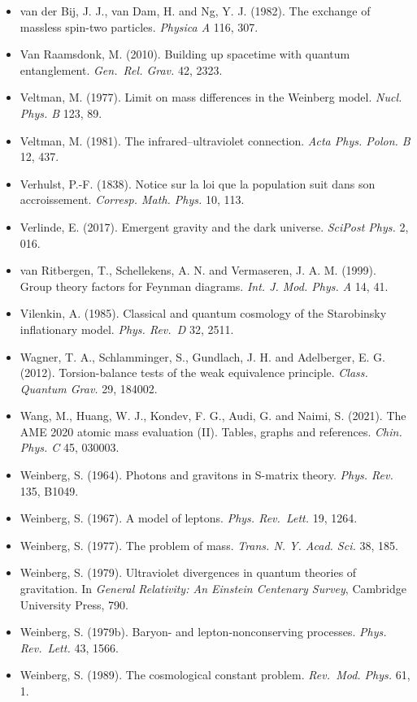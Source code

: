 \documentclass[
  11pt,
]{article}
\begin{document}
\begin{itemize}
\item
  van der Bij, J. J., van Dam, H. and Ng, Y. J. (1982). The exchange of massless spin-two particles. \emph{Physica A} 116, 307.
\item
  Van Raamsdonk, M. (2010). Building up spacetime with quantum entanglement. \emph{Gen.~Rel. Grav.} 42, 2323.
\item
  Veltman, M. (1977). Limit on mass differences in the Weinberg model. \emph{Nucl. Phys. B} 123, 89.
\item
  Veltman, M. (1981). The infrared--ultraviolet connection. \emph{Acta Phys. Polon. B} 12, 437.
\item
  Verhulst, P.-F. (1838). Notice sur la loi que la population suit dans son accroissement. \emph{Corresp. Math. Phys.} 10, 113.
\item
  Verlinde, E. (2017). Emergent gravity and the dark universe. \emph{SciPost Phys.} 2, 016.
\item
  van Ritbergen, T., Schellekens, A. N. and Vermaseren, J. A. M. (1999). Group theory factors for Feynman diagrams. \emph{Int. J. Mod. Phys. A} 14, 41.
\item
  Vilenkin, A. (1985). Classical and quantum cosmology of the Starobinsky inflationary model. \emph{Phys. Rev.~D} 32, 2511.
\item
  Wagner, T. A., Schlamminger, S., Gundlach, J. H. and Adelberger, E. G. (2012). Torsion-balance tests of the weak equivalence principle. \emph{Class. Quantum Grav.} 29, 184002.
\item
  Wang, M., Huang, W. J., Kondev, F. G., Audi, G. and Naimi, S. (2021). The AME 2020 atomic mass evaluation (II). Tables, graphs and references. \emph{Chin. Phys. C} 45, 030003.
\item
  Weinberg, S. (1964). Photons and gravitons in S-matrix theory. \emph{Phys. Rev.} 135, B1049.
\item
  Weinberg, S. (1967). A model of leptons. \emph{Phys. Rev.~Lett.} 19, 1264.
\item
  Weinberg, S. (1977). The problem of mass. \emph{Trans. N. Y. Acad. Sci.} 38, 185.
\item
  Weinberg, S. (1979). Ultraviolet divergences in quantum theories of gravitation. In \emph{General Relativity: An Einstein Centenary Survey}, Cambridge University Press, 790.
\item
  Weinberg, S. (1979b). Baryon- and lepton-nonconserving processes. \emph{Phys. Rev.~Lett.} 43, 1566.
\item
  Weinberg, S. (1989). The cosmological constant problem. \emph{Rev.~Mod. Phys.} 61, 1.

\end{itemize}
\end{document}
